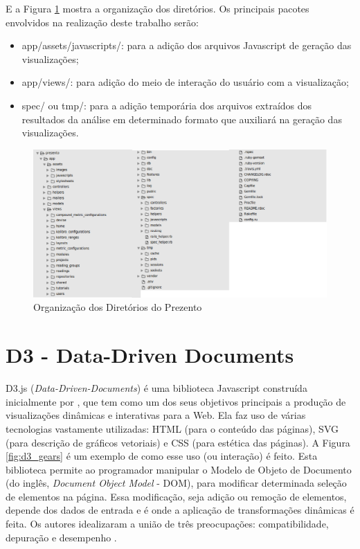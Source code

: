 \newpage

E a Figura \ref{fig:prezento_folders} mostra a organização dos diretórios. Os
principais pacotes envolvidos na realização deste trabalho serão:

\begin{itemize}
  \item app/assets/javascripts/: para a adição dos arquivos Javascript de
  geração das visualizações;
  \item app/views/: para adição do meio de interação do usuário com a
  visualização;
  \item spec/ ou tmp/: para a adição temporária dos arquivos extraídos dos
  resultados da análise em determinado formato que auxiliará na geração das
  visualizações.
\end{itemize}


\begin{figure}[!htb]
	\centering
    \includegraphics[keepaspectratio=true,scale=0.5]
    {figuras/prezento_folders.eps}
  \caption{Organização dos Diretórios do Prezento}
  \label{fig:prezento_folders}
\end{figure}

\newpage

\section{D3 - Data-Driven Documents}

D3.js (\textit{Data-Driven-Documents}) é uma biblioteca Javascript construída
inicialmente por , que tem como um dos seus objetivos
principais a produção de visualizações dinâmicas e interativas para a Web. Ela
faz uso de várias tecnologias vastamente utilizadas: HTML (para o conteúdo das
páginas), SVG (para descrição de gráficos vetoriais) e CSS (para estética das
páginas). A Figura \ref{fig:d3_gears} é um exemplo de como esse uso (ou
interação) é feito. Esta biblioteca permite ao programador manipular o Modelo de
Objeto de Documento (do inglês, \textit{Document Object Model} - DOM), para
modificar determinada seleção de elementos na página. Essa modificação, seja
adição ou remoção de elementos, depende dos dados de entrada e é onde a
aplicação de transformações dinâmicas é feita. Os autores idealizaram a união de
três preocupações: compatibilidade, depuração e desempenho \cite{bostock2011d3}.

